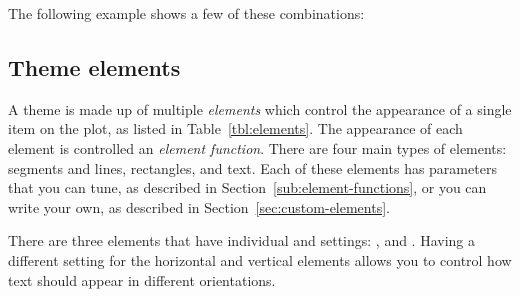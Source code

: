 \noindent The following example shows a few of these combinations:

% 
% 
% 
% 
% 


\subsection{Theme elements}
\label{sec:theme_elements}

A theme is made up of multiple \emph{elements} which control the appearance of a single item on the plot, as listed in Table~\ref{tbl:elements}.  The appearance of each element is controlled an \emph{element function}. There are four main types of elements: segments and lines, rectangles, and text.  Each of these elements has parameters that you can tune, as described in Section~\ref{sub:element-functions}, or you can write your own, as described in Section~\ref{sec:custom-elements}.

There are three elements that have individual  and  settings: ,  and .  Having a different setting for the horizontal and vertical elements allows you to control how text should appear in different orientations.

